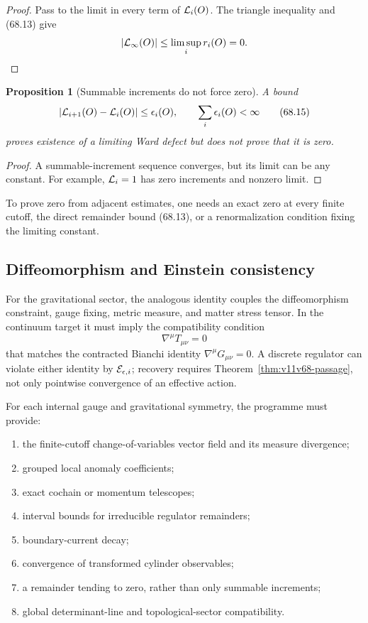 \documentclass[11pt]{article}
\newtheorem{proposition}[theorem]{Proposition}
\begin{document}
\begin{proof}
Pass to the limit in every term of \({\cal L}_i(O)\).  The triangle
inequality and (68.13) give
\[
                         |{\cal L}_\infty(O)|
                    \le\limsup_i r_i(O)=0.
\]
\end{proof}

\begin{proposition}[Summable increments do not force zero]
\label{prop:v11v68-summable}
A bound
\[
                    |{\cal L}_{i+1}(O)-{\cal L}_i(O)|
                              \le\epsilon_i(O),\qquad
                    \sum_i\epsilon_i(O)<\infty               \tag{68.15}
\]
proves existence of a limiting Ward defect but does not prove that it
is zero.
\end{proposition}

\begin{proof}
A summable-increment sequence converges, but its limit can be any
constant.  For example, \({\cal L}_i=1\) has zero increments and
nonzero limit.
\end{proof}

To prove zero from adjacent estimates, one needs an exact zero at every
finite cutoff, the direct remainder bound (68.13), or a renormalization
condition fixing the limiting constant.

\subsection{Diffeomorphism and Einstein consistency}

For the gravitational sector, the analogous identity couples the
diffeomorphism constraint, gauge fixing, metric measure, and matter
stress tensor.  In the continuum target it must imply the compatibility
condition
\[
                              \nabla^\mu T_{\mu\nu}=0          \tag{68.16}
\]
that matches the contracted Bianchi identity
\(\nabla^\mu G_{\mu\nu}=0\).  A discrete regulator can violate either
identity by \({\cal E}_{\epsilon,i}\); recovery requires
Theorem~\ref{thm:v11v68-passage}, not only pointwise convergence of an
effective action.

\begin{ledger}
\label{led:v11v68-data}
For each internal gauge and gravitational symmetry, the programme must
provide:
\begin{enumerate}
\item the finite-cutoff change-of-variables vector field and its
measure divergence;
\item grouped local anomaly coefficients;
\item exact cochain or momentum telescopes;
\item interval bounds for irreducible regulator remainders;
\item boundary-current decay;
\item convergence of transformed cylinder observables;
\item a remainder tending to zero, rather than only summable
increments;
\item global determinant-line and topological-sector compatibility.
\end{enumerate}
\end{ledger}
\end{document}
